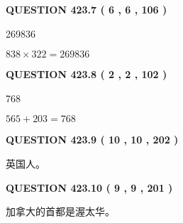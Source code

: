 \documentclass{ctexart}
\begin{document}
 
  
\vspace{0.2in}
  
{\textbf{\Large{QUESTION
423.7 
 ( 6 , 6 , 106 )
}}}
  
  
 
 
\noindent{}

269836
 
 
 
 
\noindent{}

$ %
838 \times  %
322=   %
269836$
 
 
  
\vspace{0.2in}
  
{\textbf{\Large{QUESTION
423.8 
 ( 2 , 2 , 102 )
}}}
  
  
 
 
\noindent{}

768
 
 
 
 
\noindent{}

$ %
565 +  %
203=   %
768$
 
 
  
\vspace{0.2in}
  
{\textbf{\Large{QUESTION
423.9 
 ( 10 , 10 , 202 )
}}}
  
  
 
 
\noindent{}
 
 
英国人。
 
 
 
 
  
\vspace{0.2in}
  
{\textbf{\Large{QUESTION
423.10 
 ( 9 , 9 , 201 )
}}}
  
  
 
 
\noindent{}
 
 
加拿大的首都是渥太华。
 
 
 
 
   
\end{document}
